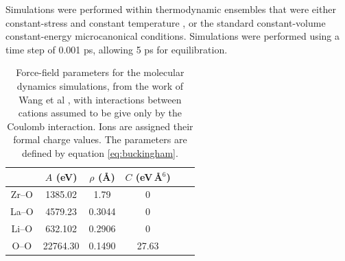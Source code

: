 \documentclass[twoside,twocolumn,9pt]{article}
\begin{document}
Simulations were performed within thermodynamic ensembles that were either constant-stress \cite{Parrinello:1980kx, Melchionna:2006fi} and constant temperature \cite{Nose:1984bf, Hoover:1985cu}, or the standard constant-volume constant-energy microcanonical conditions. Simulations were performed using a time step of 0.001 ps, allowing 5 ps for equilibration.



\begin{table}[t]
\centering
\caption{Force-field parameters for the molecular dynamics simulations, from the work of Wang et al \cite{Wang:2014ic}, with interactions between cations assumed to be give only by the Coulomb interaction. Ions are assigned their formal charge values. The parameters are defined by equation \ref{eq:buckingham}.} \label{tab:md_force}
\begin{tabular}{cccccc}
\hline
      & $A$ (eV)  & $\rho$ (\AA) & $C$ (eV\,\AA$^6$)           \\
\hline
Zr--O  & 1385.02 & 1.79        & 0                      \\
La--O  & 4579.23 & 0.3044      & 0                      \\
Li--O  & 632.102 & 0.2906      & 0                      \\
O--O   & 22764.30& 0.1490      & 27.63                  \\
\hline
\end{tabular}
\end{table}
\end{document}
